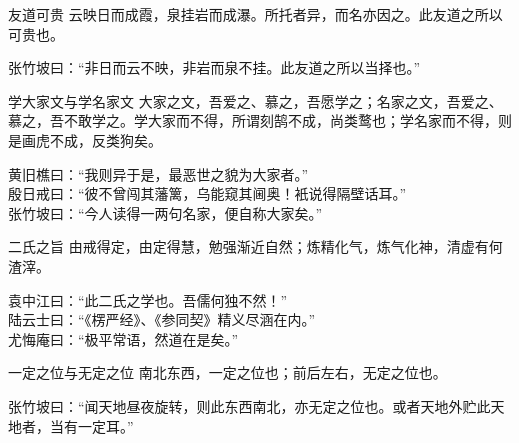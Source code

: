 \begin{yulu}{友道可贵}
云映日而成霞，泉挂岩而成瀑。所托者异，而名亦因之。此友道之所以可贵也。
\begin{comments}
张竹坡曰：“非日而云不映，非岩而泉不挂。此友道之所以当择也。”
\end{comments}
\end{yulu}

\begin{yulu}{学大家文与学名家文}
大家之文，吾爱之、慕之，吾愿学之；名家之文，吾爱之、慕之，吾不敢学之。学大家而不得，所谓刻鹄不成，尚类鹜也；学名家而不得，则是画虎不成，反类狗矣。
\begin{comments}
黄旧樵曰：“我则异于是，最恶世之貌为大家者。” \\
殷日戒曰：“彼不曾闯其藩篱，乌能窥其阃奥！衹说得隔壁话耳。” \\
张竹坡曰：“今人读得一两句名家，便自称大家矣。”
\end{comments}
\end{yulu}

\begin{yulu}{二氏之旨}
由戒得定，由定得慧，勉强渐近自然；炼精化气，炼气化神，清虚有何渣滓。
\begin{comments}
袁中江曰：“此二氏之学也。吾儒何独不然！” \\
陆云士曰：“《楞严经》、《参同契》精义尽涵在内。” \\
尤悔庵曰：“极平常语，然道在是矣。”
\end{comments}
\end{yulu}

\begin{yulu}{一定之位与无定之位}
南北东西，一定之位也；前后左右，无定之位也。
\begin{comments}
张竹坡曰：“闻天地昼夜旋转，则此东西南北，亦无定之位也。或者天地外贮此天地者，当有一定耳。”
\end{comments}
\end{yulu}

